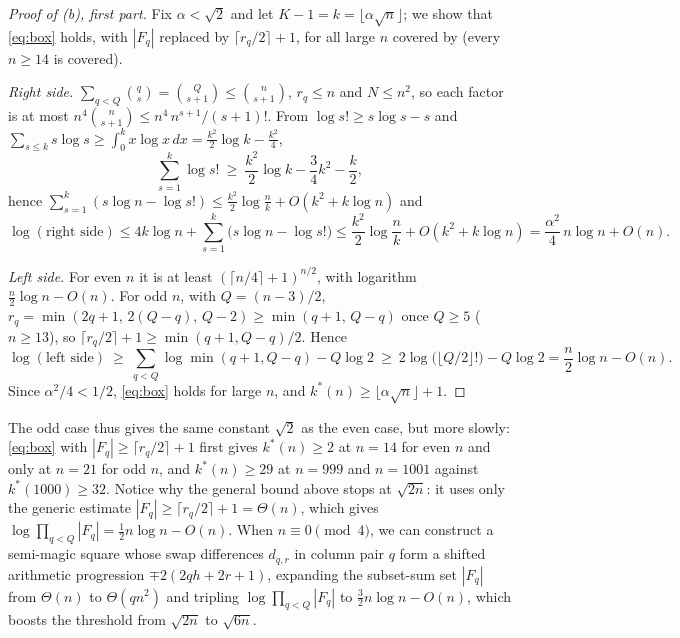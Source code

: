 \begin{proof}[Proof of (b), first part]
Fix $\alpha<\sqrt2$ and let $K-1=k=\lfloor\alpha\sqrt n\rfloor$; we show that \eqref{eq:box} holds, with $|F_q|$ replaced by $\lceil r_q/2\rceil+1$, for all large $n$ covered by  (every $n\ge14$ is covered).

\emph{Right side.} $\sum_{q<Q}\binom qs=\binom Q{s+1}\le\binom n{s+1}$, $r_q\le n$ and $N\le n^2$, so each factor is at most $n^4\binom n{s+1}\le n^4\,n^{s+1}/(s+1)!$.
From $\log s!\ge s\log s-s$ and $\sum_{s\le k}s\log s\ge\int_0^kx\log x\,dx=\frac{k^2}2\log k-\frac{k^2}4$,
\[
\sum_{s=1}^{k}\log s!\ \ge\ \frac{k^2}2\log k-\frac34k^2-\frac k2 ,
\]
hence $\sum_{s=1}^{k}(s\log n-\log s!)\le\frac{k^2}2\log\frac nk+O(k^2+k\log n)$ and
\[
\log(\text{right side})\le4k\log n+\sum_{s=1}^{k}\bigl(s\log n-\log s!\bigr)\le\frac{k^2}2\log\frac nk+O(k^2+k\log n)=\frac{\alpha^2}4\,n\log n+O(n).
\]

\emph{Left side.} For even $n$ it is at least $(\lceil n/4\rceil+1)^{n/2}$, with logarithm $\frac n2\log n-O(n)$.
For odd $n$, with $Q=(n-3)/2$, $r_q=\min(2q+1,\,2(Q-q),\,Q-2)\ge\min(q+1,\,Q-q)$ once $Q\ge5$ ($n\ge13$), so $\lceil r_q/2\rceil+1\ge\min(q+1,Q-q)/2$.
Hence
\[
\log(\text{left side})\ \ge\ \sum_{q<Q}\log\min(q+1,Q-q)-Q\log2\ \ge\ 2\log\bigl(\lfloor Q/2\rfloor!\bigr)-Q\log2=\frac n2\log n-O(n).
\]
Since $\alpha^2/4<1/2$, \eqref{eq:box} holds for large $n$, and $k^*(n)\ge\lfloor\alpha\sqrt n\rfloor+1$.
\end{proof}

The odd case thus gives the same constant $\sqrt2$ as the even case, but more slowly: \eqref{eq:box} with $|F_q|\ge\lceil r_q/2\rceil+1$ first gives $k^*(n)\ge2$ at $n=14$ for even $n$ and only at $n=21$ for odd $n$, and $k^*(n)\ge29$ at $n=999$ and $n=1001$ against $k^*(1000)\ge32$.
Notice why the general bound above stops at $\sqrt{2n}$: it uses only the generic estimate $|F_q|\ge\lceil r_q/2\rceil+1=\Theta(n)$, which gives $\log\prod_{q<Q}|F_q|=\frac12n\log n-O(n)$. When $n\equiv0\pmod 4$, we can construct a semi-magic square whose swap differences $d_{q,r}$ in column pair $q$ form a shifted arithmetic progression $\mp2(2qh+2r+1)$, expanding the subset-sum set $|F_q|$ from $\Theta(n)$ to $\Theta(qn^2)$ and tripling $\log\prod_{q<Q}|F_q|$ to $\frac32n\log n-O(n)$, which boosts the threshold from $\sqrt{2n}$ to $\sqrt{6n}$.

